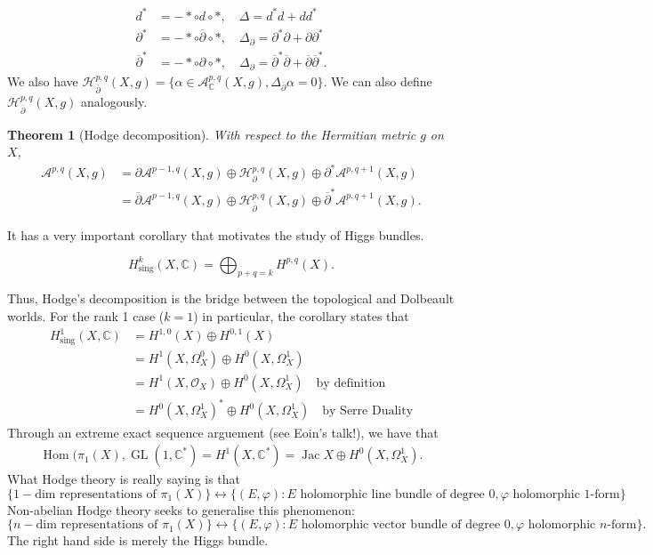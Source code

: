 \documentclass[10pt, a4paper]{article}
\theoremstyle{plain}
\newtheorem{thrm}{Theorem}[section]
\theoremstyle{definition}
\DeclareMathOperator{\Hom}{Hom}
\DeclareMathOperator{\GL}{GL}
\DeclareMathOperator{\Jac}{Jac}
\begin{document}
\begin{align*}
d^* &= - \ast \circ d \circ *, \quad \Delta = d^*d+dd^* \\
\partial^* &= - \ast \circ \overline{\partial}  \circ *, \quad \Delta_{\partial} = \partial^*\partial+\partial \partial^* \\
\overline{\partial}^* &= - \ast \circ \partial \circ *, \quad \Delta_{\partial} = \overline{\partial}  ^*\overline{\partial}  +\overline{\partial} \overline{\partial} ^*.
\end{align*}
We also have $\mathcal{H}^{p, q}_{\overline{\partial}} (X, g)= \{\alpha \in \mathcal{A}^{p, q}_\mathbb{C}(X, g), \Delta_{\overline{\partial}}\alpha = 0\}$. We can also define $\mathcal{H}^{p, q}_{\overline{\partial}} (X, g)$ analogously. 
\begin{thrm}[Hodge decomposition] With respect to the Hermitian metric $g$ on $X$, 
\begin{align*}
\mathcal{A}^{p, q}(X, g) &= \partial \mathcal{A}^{p-1, q}(X, g) \oplus \mathcal{H}^{p, q}_{\partial} (X, g) \oplus  \partial^* \mathcal{A}^{p, q+1}(X, g) \\
&= \overline{\partial} \mathcal{A}^{p-1, q}(X, g) \oplus \mathcal{H}^{p, q}_{\overline{\partial}} (X, g) \oplus  \overline{\partial}^* \mathcal{A}^{p, q+1}(X, g).
\end{align*}
\end{thrm} 
It has a very important corollary that motivates the study of Higgs bundles. 
\begin{cor} 
$$H^k_{\text{sing}}(X, \mathbb{C}) = \bigoplus_{p+q=k} H^{p, q}(X).$$
\end{cor} 
Thus, Hodge's decomposition is the bridge between the topological and Dolbeault worlds. For the rank 1 case ($k = 1$) in particular, the corollary states that
\begin{align*}
H^1_{\text{sing}}(X, \mathbb{C}) &= H^{1, 0}(X) \oplus H^{0, 1}(X) \\
&= H^1(X, \Omega^0_X) \oplus H^0(X, \Omega^1_X) \\
&=  H^1(X, \mathcal{O}_X) \oplus H^0(X, \Omega^1_X) \quad \text{by definition} \\
&= H^0(X, \Omega^1_X)^* \oplus H^0(X, \Omega^1_X) \quad \text{by Serre Duality} 
\end{align*}
Through an extreme exact sequence arguement (see Eoin's talk!), we have that
\begin{align*}
\Hom(\pi_1(X), \GL(1, \mathbb{C}^*) = H^1(X, \mathbb{C}^*) = \Jac X \oplus H^0(X, \Omega^1_X).
\end{align*}
What Hodge theory is really saying is that
$$\{1- \text{dim representations of } \pi_1(X)\} \leftrightarrow \{(E, \varphi) : E \text{ holomorphic line bundle of degree 0}, \varphi \text{ holomorphic 1-form}\}$$
Non-abelian Hodge theory seeks to generalise this phenomenon:
$$\{n- \text{dim representations of } \pi_1(X)\} \leftrightarrow \{(E, \varphi) : E \text{ holomorphic vector bundle of degree 0}, \varphi \text{ holomorphic $n$-form}\}.$$
The right hand side is merely the Higgs bundle. 
\end{document}
